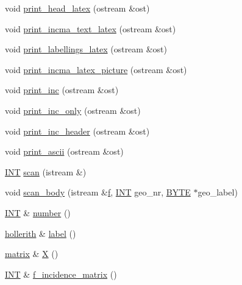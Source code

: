 \begin{DoxyCompactItemize}
void \mbox{\hyperlink{classgeometry_a1a65ce3ff3b89b6bb663aa9a559ada2a}{print\+\_\+head\+\_\+latex}} (ostream \&ost)
\item 
void \mbox{\hyperlink{classgeometry_a400fa93fa773518f7b55c454fa69ee78}{print\+\_\+incma\+\_\+text\+\_\+latex}} (ostream \&ost)
\item 
void \mbox{\hyperlink{classgeometry_a1c734bead42349ddea1ad290dc06c428}{print\+\_\+labellings\+\_\+latex}} (ostream \&ost)
\item 
void \mbox{\hyperlink{classgeometry_ae0d174439d57d9bc0b0dd7ffe210b148}{print\+\_\+incma\+\_\+latex\+\_\+picture}} (ostream \&ost)
\item 
void \mbox{\hyperlink{classgeometry_a8b902a6f06a92a18b345e4de42e6508d}{print\+\_\+inc}} (ostream \&ost)
\item 
void \mbox{\hyperlink{classgeometry_a6086ce49de61288d20a69a4dfed44a35}{print\+\_\+inc\+\_\+only}} (ostream \&ost)
\item 
void \mbox{\hyperlink{classgeometry_ab78810f270f25de6b65169d5c62d7806}{print\+\_\+inc\+\_\+header}} (ostream \&ost)
\item 
void \mbox{\hyperlink{classgeometry_a8f5356989decb76fddb4926714240c0d}{print\+\_\+ascii}} (ostream \&ost)
\item 
\mbox{\hyperlink{galois_8h_a09fddde158a3a20bd2dcadb609de11dc}{I\+NT}} \mbox{\hyperlink{classgeometry_ac6f757d1a8855800d3da3fa1e83e812d}{scan}} (istream \&)
\item 
void \mbox{\hyperlink{classgeometry_a71bc2e3a3f4ca02e8518ab5518a4e0df}{scan\+\_\+body}} (istream \&\mbox{\hyperlink{alphabet2_8_c_a362077c979b0bb65159c603270e40f70}{f}}, \mbox{\hyperlink{galois_8h_a09fddde158a3a20bd2dcadb609de11dc}{I\+NT}} geo\+\_\+nr, \mbox{\hyperlink{galois_8h_ab6cc7b4aeb6ea31aba2b3fbfc83ff5e6}{B\+Y\+TE}} $\ast$geo\+\_\+label)
\item 
\mbox{\hyperlink{galois_8h_a09fddde158a3a20bd2dcadb609de11dc}{I\+NT}} \& \mbox{\hyperlink{classgeometry_a47f809adc7a1158065da4dfae214f05f}{number}} ()
\item 
\mbox{\hyperlink{classhollerith}{hollerith}} \& \mbox{\hyperlink{classgeometry_a8be3ddf6aebe1e3c52b67cfe316e638f}{label}} ()
\item 
\mbox{\hyperlink{classmatrix}{matrix}} \& \mbox{\hyperlink{classgeometry_a2eff9c42b83c90012092d49218237d9d}{X}} ()
\item 
\mbox{\hyperlink{galois_8h_a09fddde158a3a20bd2dcadb609de11dc}{I\+NT}} \& \mbox{\hyperlink{classgeometry_a05bd36071a53d68e1c4b0ba981c9cd34}{f\+\_\+incidence\+\_\+matrix}} ()

\end{DoxyCompactItemize}
